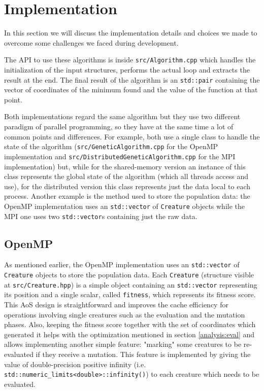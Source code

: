 \documentclass[12pt,a4paper,oneside]{article}
\begin{document}
	\clearpage
	\section{Implementation}
	In this section we will discuss the implementation details and choices we made to overcome some challenges we faced during development.

	The API to use these algorithms is inside \texttt{src/Algorithm.cpp} which handles the initialization of the input structures, performs the actual loop and extracts the result at the end.
	The final result of the algorithm is an \texttt{std::pair} containing the vector of coordinates of the minimum found and the value of the function at that point.

	Both implementations regard the same algorithm but they use two different paradigm of parallel programming, so they have at the same time a lot of common points and differences.
	For example, both use a single class to handle the state of the algorithm (\texttt{src/GeneticAlgorithm.cpp} for the OpenMP implementation and \texttt{src/DistributedGeneticAlgorithm.cpp} for the MPI implementation) but, while for the shared-memory version an instance of this class represents the global state of the algorithm (which all threads access and use), for the distributed version this class represents just the data local to each process.
	Another example is the method used to store the population data: the OpenMP implementation uses an \texttt{std::vector} of \texttt{Creature} objects while the MPI one uses two \texttt{std::vector}s containing just the raw data.

	\subsection{OpenMP}
	As mentioned earlier, the OpenMP implementation uses an \texttt{std::vector} of \texttt{Creature} objects to store the population data.
	Each \texttt{Creature} (structure visible at \texttt{src/Creature.hpp}) is a simple object containing an \texttt{std::vector} representing its position and a single scalar, called \texttt{fitness}, which represents its fitness score.
	This AoS design is straightforward and improves the cache efficiency for operations involving single creatures such as the evaluation and the mutation phases.
	Also, keeping the fitness score together with the set of coordinates which generated it helps with the optimization mentioned in section \ref{analysis:eval} and allows implementing another simple feature: "marking" some creatures to be re-evaluated if they receive a mutation.
	This feature is implemented by giving the value of double-precision positive infinity (i.e. \texttt{std::numeric\_limits<double>::infinity()}) to each creature which needs to be evaluated.
\end{document}

